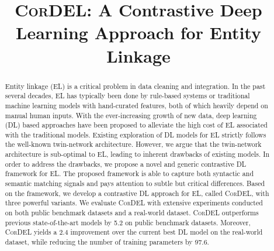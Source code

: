 \documentclass[conference]{IEEEtran}
\begin{document}
\title{\textsc{CorDEL}: A Contrastive Deep Learning Approach for Entity Linkage}

\author{
\and
{}
\and
{}
}

\maketitle

\begin{abstract}
    Entity linkage (EL) is a critical problem in data cleaning and integration. In the past several decades, EL has typically been done by rule-based systems or traditional machine learning models with hand-curated features, both of which heavily depend on manual human inputs. With the ever-increasing growth of new data, deep learning (DL) based approaches have been proposed to alleviate the high cost of EL associated with the traditional models. Existing exploration of DL models for EL strictly follows the well-known twin-network architecture. However, we argue that the twin-network architecture is sub-optimal to EL, leading to inherent drawbacks of existing models. In order to address the drawbacks, we propose a novel and generic contrastive DL framework for EL. The proposed framework is able to capture both syntactic and semantic matching signals and pays attention to subtle but critical differences. Based on the framework, we develop a contrastive DL approach for EL, called \textsc{CorDEL}, with three powerful variants. We evaluate \textsc{CorDEL} with extensive experiments conducted on both public benchmark datasets and a real-world dataset. \textsc{CorDEL} outperforms previous state-of-the-art models by 5.2 on public benchmark datasets. Moreover, \textsc{CorDEL} yields a 2.4 improvement over the current best DL model on the real-world dataset, while reducing the number of training parameters by 97.6. 
\end{abstract}
\end{document}
